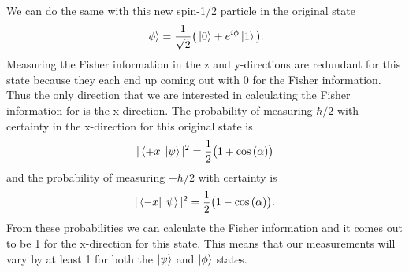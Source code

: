 \documentclass[twocolumn]{article}
\begin{document}
We can do the same with this new spin-1/2 particle in the original state
\begin{equation}
\ket{\phi}=\frac{1}{\sqrt{2}}\big(\ket{0}+e^{i\phi}\ket{1}\big).
\end{equation}
Measuring the Fisher information in the z and y-directions are redundant for this state because they each end up coming out with 0 for the Fisher information. Thus the only direction that we are interested in calculating the Fisher information for is the x-direction. The probability of measuring $\hbar/2$ with certainty in the x-direction for this original state is
\begin{equation}
|\bra{+x}\ket{\psi}|^2=\frac{1}{2}\big(1+\cos{(\alpha)}\big)
\end{equation}
and the probability of measuring $-\hbar/2$ with certainty is
\begin{equation}
|\bra{-x}\ket{\psi}|^2=\frac{1}{2}\big(1-\cos{(\alpha)}\big).
\end{equation}
From these probabilities we can calculate the Fisher information and it comes out to be 1 for the x-direction for this state. This means that our measurements will vary by at least 1 for both the $\ket{\psi}$ and $\ket{\phi}$ states.
\end{document}
